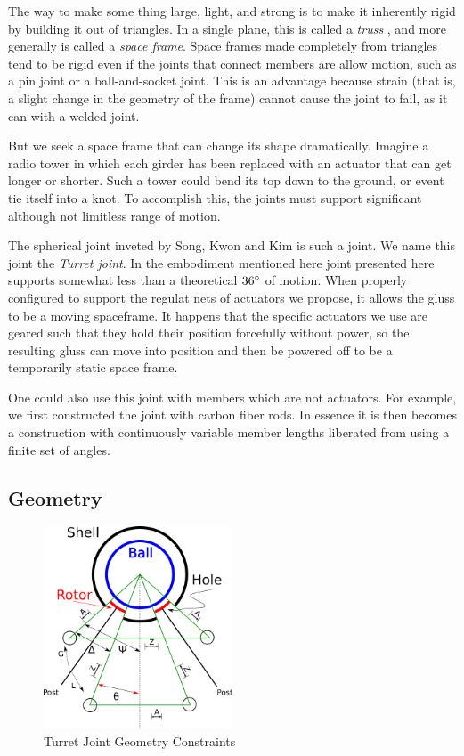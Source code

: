 \documentclass[12pt]{article}
\begin{document}
The way to make some thing large, light, and strong is to make it inherently rigid by building it
out of triangles. In a single plane, this is called a \emph{truss} \cite{ambrose1993building}, and more generally is called
a \emph{space frame}.  Space frames made completely from triangles tend to be rigid even if the
joints that connect members are allow motion, such as a pin joint or a ball-and-socket joint. This
is an advantage because strain (that is, a slight change in the geometry of the frame) cannot cause
the joint to fail, as it can with a welded joint.

But we seek a space frame that can change its shape dramatically. Imagine a radio tower in which
each girder has been replaced with an actuator that can get longer or shorter. Such a tower could
bend its top down to the ground, or event
tie itself into a knot. To accomplish this, the joints must support significant although not
limitless range of motion. 

The spherical joint inveted by Song, Kwon and Kim \cite{song2003spherical} is such a joint.
We name this joint the \emph{Turret joint}.
In the embodiment mentioned here joint presented here supports somewhat less than a theoretical
$36\degree$ of motion.
When properly configured to support the regulat nets of actuators we propose,
it allows the gluss to be a moving spaceframe. It happens that the specific actuators we use
are geared such that they hold their position forcefully without power, so the resulting gluss
can move into position and then be powered off to be a temporarily static space frame.

One could also use this joint with members which are not actuators. For example, we first
constructed the joint with carbon fiber rods. In essence it is then becomes a construction with continuously
variable member lengths liberated from using a finite set of angles.

\subsection{Geometry}

\begin{figure}[!ht]
  \centering
    \includegraphics[width=0.5\textwidth]{ConstraintDrawing.png}
    \caption[Constraints]{Turret Joint Geometry Constraints}
      \label{constraint-drawing}
\end{figure}
\end{document}
